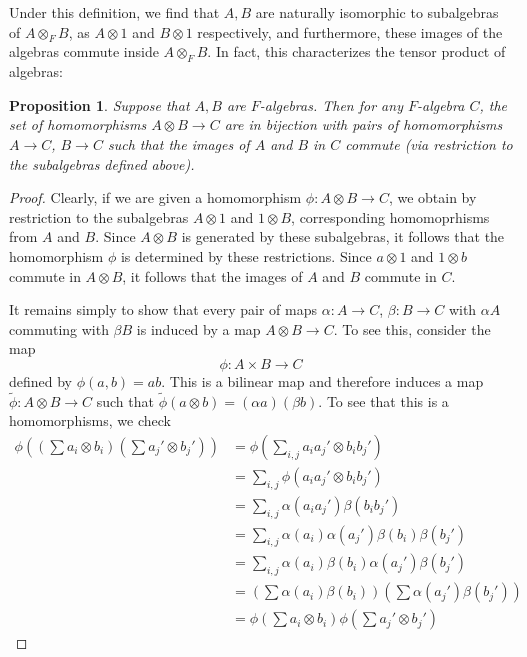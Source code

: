 \documentclass[12pt]{report}
\theoremstyle{plain}
\newtheorem{prop}[thm]{Proposition}
\newcommand{\til}{\widetilde}
\begin{document}
Under this definition, we find that $A, B$ are naturally isomorphic to
subalgebras of $A \otimes_F B$, as $A \otimes 1$ and $B \otimes 1$
respectively, and furthermore, these images of the algebras commute inside
$A \otimes_F B$. In fact, this characterizes the tensor product of
algebras:

\begin{prop}
Suppose that $A, B$ are $F$-algebras. Then for any $F$-algebra $C$, the set
of homomorphisms $A \otimes B \to C$ are in bijection with pairs of
homomorphisms $A \to C$, $B \to C$ such that the images of $A$ and $B$ in
$C$ commute (via restriction to the subalgebras defined above).
\end{prop}
\begin{proof}
Clearly, if we are given a homomorphism $\phi: A \otimes B \to C$, we
obtain by restriction to the subalgebras $A \otimes 1$ and $1 \otimes B$,
corresponding homomoprhisms from $A$ and $B$. Since $A \otimes B$ is
generated by these subalgebras, it follows that the homomorphism $\phi$ is
determined by these restrictions. Since $a \otimes 1$ and $1 \otimes b$
commute in $A \otimes B$, it follows that the images of $A$ and $B$ commute
in $C$.

It remains simply to show that every pair of maps $\alpha : A \to C$,
$\beta : B \to C$ with $\alpha A$ commuting with $\beta B$ is induced by a
map $A \otimes B \to C$. To see this, consider the map
\[\phi: A \times B \to C\]
defined by $\phi (a, b) = ab$. This is a bilinear map and therefore induces
a map $\til \phi: A \otimes B \to C$ such that $\til \phi(a \otimes b) =
(\alpha a) (\beta b)$. To see that this is a homomorphisms, we check
\begin{align*}
\phi\left((\sum a_i \otimes b_i)(\sum a_j' \otimes b_j')\right) &= 
\phi \left(\sum_{i,j} a_i a_j' \otimes b_i b_j'\right) \\
&= \sum_{i,j} \phi(a_i
a_j' \otimes b_i b_j') \\
&= \sum_{i,j} \alpha(a_i a_j') \beta(b_i b_j') \\
&= \sum_{i,j} \alpha(a_i)\alpha(a_j') \beta(b_i)\beta(b_j') \\
&= \sum_{i,j} \alpha(a_i)\beta(b_i)\alpha(a_j') \beta(b_j') \\
&= \left(\sum \alpha(a_i)\beta(b_i)\right) \left(\sum
\alpha(a_j')\beta(b_j')\right) \\
&= \phi\left(\sum a_i \otimes b_i\right) \phi\left(\sum a_j' \otimes
b_j'\right)
\end{align*}
\end{proof}
\end{document}
